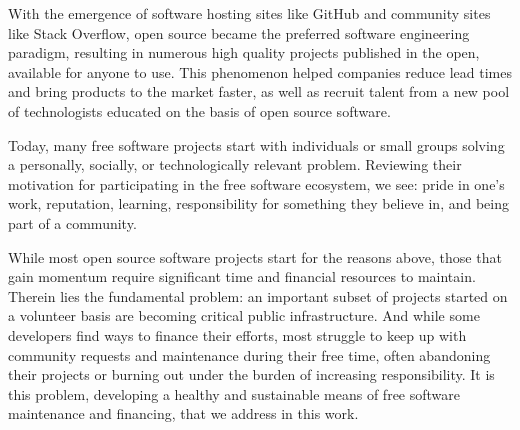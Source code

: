 With the emergence of software hosting sites like GitHub and community sites
like Stack Overflow, open source became the preferred software engineering
paradigm, resulting in numerous high quality projects published in the open,
available for anyone to use. This phenomenon helped
companies reduce lead times and bring products to the market faster, as well as
recruit talent from a new pool of technologists educated on the basis of
open source software.

Today, many free software projects start with individuals or small groups
solving a personally, socially, or technologically relevant problem.
Reviewing their motivation for participating in the free software ecosystem,
we see: pride in one's work, reputation, learning,
responsibility for something they believe in, and being part of a community.

While most open source software projects start for the reasons above, those
that gain momentum require significant time and financial resources to
maintain. Therein lies the fundamental problem: an important subset of projects
started on a volunteer basis are becoming critical public
infrastructure. And while some developers find ways to finance their efforts,
most struggle to keep up with community requests and maintenance during their
free time, often abandoning their projects or burning out under the burden of
increasing responsibility. It is this problem, developing a healthy and
sustainable means of free software maintenance and financing, that we address
in this work.
